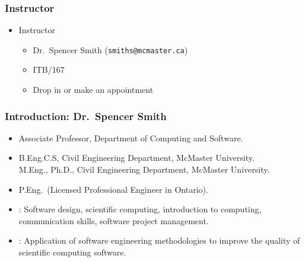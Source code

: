\documentclass[t,12pt,numbers,fleqn]{beamer}
\begin{document}

\begin{frame}
\frametitle{Instructor}

\begin{itemize}

\item Instructor
\begin{itemize}
\item Dr.\ Spencer Smith ({\tt smiths@mcmaster.ca})
\item ITB/167
\item Drop in or make an appointment
\end{itemize}

\end{itemize}

\end{frame}


\begin{frame}
\frametitle{Introduction: Dr.\ Spencer Smith} 
\begin{itemize}
 
   \item Associate Professor, Department of Computing and Software.
   
   \item B.Eng.C.S, Civil Engineering Department, McMaster University. \\
         M.Eng., Ph.D., Civil Engineering Department, McMaster University.
 
   \item P.Eng.~(Licensed Professional Engineer in Ontario).
 
   \item {}: Software design, scientific computing, introduction to computing, 
     communication skills, software project management.
 
   \item {}: Application of software engineering methodologies to improve the quality of
     scientific computing software.
 
 \end{itemize}

\end{frame}   

\end{document}
